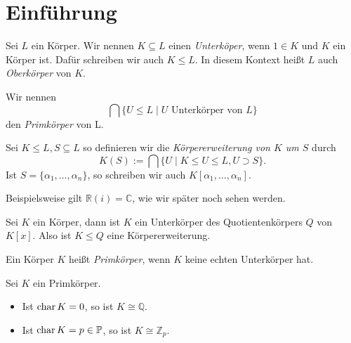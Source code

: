 \section{Einführung}

\begin{definition}
    Sei $L$ ein Körper. Wir nennen $K \subseteq L$ einen \emph{Unterköper}, wenn $1 \in K$ und $K$ ein Körper ist. Dafür schreiben wir auch $K \leq L$. In diesem Kontext heißt $L$ auch \emph{Oberkörper} von $K$.

    Wir nennen
    $$ \bigcap \{ U \leq L \mid U \text{ Unterkörper von } L \} $$
    den \emph{Primkörper} von L.

    Sei $K \leq L, S \subseteq L$ so definieren wir die \emph{Körpererweiterung von $K$ um $S$} durch
    $$ K(S) := \bigcap \{ U \mid K \leq U \leq L, U \supset S \}. $$
    Ist $S = \{ \alpha_1, \hdots, \alpha_n \}$, so schreiben wir auch $K[\alpha_1, \hdots, \alpha_n]$.
\end{definition}

\begin{remark}
    Beispielsweise gilt $\mathbb{R}(i) = \mathbb{C}$, wie wir später noch sehen werden.
\end{remark}

\begin{remark}
    Sei $K$ ein Körper, dann ist $K$ ein Unterkörper des Quotientenkörpers $Q$ von $K[x]$. Also ist $K \leq Q$ eine Körpererweiterung.
\end{remark}

\begin{definition}
    Ein Körper $K$ heißt \emph{Primkörper}, wenn $K$ keine echten Unterkörper hat.
\end{definition}

\begin{theorem}
    Sei $K$ ein Primkörper.
    \begin{itemize}
        \item Ist $\operatorname{char} K = 0$, so ist $K \cong \mathbb{Q}$.
        \item Ist $\operatorname{char} K = p \in \mathbb{P}$, so ist $K \cong \mathbb{Z}_p$.
    \end{itemize}
\end{theorem}